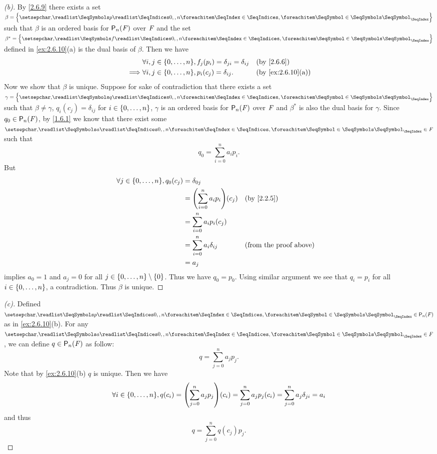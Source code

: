 \begin{proof}[(b)]
  By \cref{2.6.9} there exists a set \(\beta = \set{\seq{p}{0,,n}}\) such that \(\beta\) is an ordered basis for \(\ps[n]{\F}\) over \(\mathit{F}\) and the set \(\beta^* = \set{\seq{f}{0,,n}}\) defined in \cref{ex:2.6.10}(a) is the dual basis of \(\beta\).
  Then we have
  \begin{align*}
             & \forall i, j \in \set{0, \dots, n}, f_j(p_i) = \delta_{j i} = \delta_{i j} &  & \text{(by \cref{2.6.6})}        \\
    \implies & \forall i, j \in \set{0, \dots, n}, p_i(c_j) = \delta_{i j}.               &  & \text{(by \cref{ex:2.6.10}(a))}
  \end{align*}
  Now we show that \(\beta\) is unique.
  Suppose for sake of contradiction that there exists a set \(\gamma = \set{\seq{q}{0,,n}}\) such that \(\beta \neq \gamma\), \(q_i(c_j) = \delta_{i j}\) for \(i \in \left\lbrace0, \dots, n\right\rbrace\), \(\gamma\) is an ordered basis for \(\ps[n]{\F}\) over \(\mathit{F}\) and \(\beta^*\) is also the dual basis for \(\gamma\).
  Since \(q_0 \in \ps[n]{\F}\), by \cref{1.6.1} we know that there exist some \(\seq{a}{0,,n} \in \F\) such that
  \[
    q_0 = \sum_{i = 0}^n a_i p_i.
  \]
  But
  \begin{align*}
    \forall j \in \set{0, \dots, n}, q_0(c_j) & = \delta_{0 j}                                                        \\
                                              & = \pa{\sum_{i = 0}^n a_i p_i}(c_j) &  & \text{(by \cref{2.2.5})}      \\
                                              & = \sum_{i = 0}^n a_i p_i(c_j)                                         \\
                                              & = \sum_{i = 0}^n a_i \delta_{i j}  &  & \text{(from the proof above)} \\
                                              & = a_j
  \end{align*}
  implies \(a_0 = 1\) and \(a_j = 0\) for all \(j \in \left\lbrace0, \dots, n\right\rbrace \setminus \left\lbrace0\right\rbrace\).
  Thus we have \(q_0 = p_0\).
  Using similar argument we see that \(q_i = p_i\) for all \(i \in \left\lbrace0, \dots, n\right\rbrace\), a contradiction.
  Thus \(\beta\) is unique.
\end{proof}

\begin{proof}[(c)]
  Defined \(\seq{p}{0,,n} \in \ps[n]{\F}\) as in \cref{ex:2.6.10}(b).
  For any \(\seq{a}{0,,n} \in \F\), we can define \(q \in \ps[n]{\F}\) as follow:
  \[
    q = \sum_{j = 0}^n a_j p_j.
  \]
  Note that by \cref{ex:2.6.10}(b) \(q\) is unique.
  Then we have
  \[
    \forall i \in \set{0, \dots, n}, q(c_i) = \pa{\sum_{j = 0}^n a_j p_j}(c_i) = \sum_{j = 0}^n a_j p_j(c_i) = \sum_{j = 0}^n a_j \delta_{j i} = a_i
  \]
  and thus
  \[
    q = \sum_{j = 0}^n q(c_j) p_j.
  \]
\end{proof}

